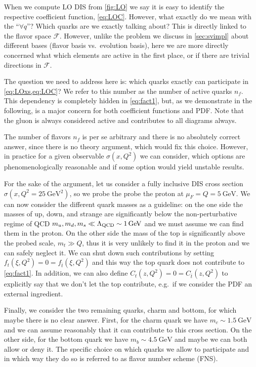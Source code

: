 When we compute LO DIS from \cref{fig:LO} we say it is easy to identify the respective coefficient function, \cref{eq:LOC}.
However, what exactly do we mean with the \enquote{$\forall q$}?
Which quarks are we exactly talking about?
This is directly linked to the flavor space $\mathcal F$.
However, unlike the problem we discuss in \cref{sec:svimpl} about different bases (flavor basis vs.\ evolution basis), here we are more directly concerned what which elements are active in the first place, or if there are trivial directions in $\mathcal F$.

The question we need to address here is: which quarks exactly can participate in \cref{eq:LOxs,eq:LOC}?
We refer to this number as the number of active quarks $n_f$.
This dependency is completely hidden in \cref{eq:fact1}, but, as we demonstrate in the following, is a major concern for both coefficient functions and PDF.
Note that the gluon is always considered active and contributes to all diagrams always.

The number of flavors $n_f$ is per se arbitrary and there is no absolutely correct answer, since there is no theory argument, which would fix this choice.
However, in practice for a given observable $\sigma(x,Q^2)$ we can consider, which options are phenomenologically reasonable and if some option would yield unstable results.

For the sake of the argument, let us consider a fully inclusive DIS cross section $\sigma(x,Q^2=\SI{25}{\GeV^2})$, so we probe the probe the proton at $\mu_F=Q=\SI{5}{\GeV}$.
We can now consider the different quark masses as a guideline: on the one side the masses of up, down, and strange are significantly below the non-perturbative regime of QCD $m_u,m_d,m_s \ll \LQCD \sim \SI{1}{\GeV}$ and we must assume we can find them in the proton.
On the other side the mass of the top is significantly above the probed scale, $m_t \gg Q$, thus it is very unlikely to find it in the proton and we can safely neglect it.
We can shut down such contributions by setting $f_t(\xi, Q^2) = 0 = f_{\bar t}(\xi, Q^2)$ and this way the top quark does not contribute to \cref{eq:fact1}.
In addition, we can also define $C_t(z, Q^2) = 0 = C_{\bar t}(z, Q^2)$ to explicitly say that we don't let the top contribute, e.g.\ if we consider the PDF an external ingredient.

Finally, we consider the two remaining quarks, charm and bottom, for which maybe there is no clear answer.
First, for the charm quark we have $m_c \sim \SI{1.5}{\GeV}$ and we can assume reasonably that it can contribute to this cross section.
On the other side, for the bottom quark we have $m_b \sim \SI{4.5}{\GeV}$ and maybe we can both allow or deny it.
The specific choice on which quarks we allow to participate and in which way they do so is referred to as flavor number scheme (FNS).


